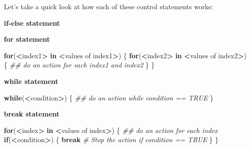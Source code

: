 \documentclass[
]{book}
\newenvironment{Shaded}{\begin{snugshade}}{\end{snugshade}}
\newcommand{\CommentTok}[1]{\textcolor[rgb]{0.56,0.35,0.01}{\textit{#1}}}
\newcommand{\ControlFlowTok}[1]{\textcolor[rgb]{0.13,0.29,0.53}{\textbf{#1}}}
\newcommand{\NormalTok}[1]{#1}
\newcommand{\OperatorTok}[1]{\textcolor[rgb]{0.81,0.36,0.00}{\textbf{#1}}}
\newcommand{\StringTok}[1]{\textcolor[rgb]{0.31,0.60,0.02}{#1}}
\begin{document}
Let's take a quick look at how each of these control statements works:

\textbf{if-else statement}

\begin{Shaded}
\end{Shaded}

\textbf{for statement}

\begin{Shaded}
\begin{Highlighting}[]
\ControlFlowTok{for}\NormalTok{(}\OperatorTok{<}\NormalTok{index1}\OperatorTok{>}\StringTok{ }\ControlFlowTok{in} \OperatorTok{<}\NormalTok{values of index1}\OperatorTok{>}\NormalTok{) \{}
  \ControlFlowTok{for}\NormalTok{(}\OperatorTok{<}\NormalTok{index2}\OperatorTok{>}\StringTok{ }\ControlFlowTok{in} \OperatorTok{<}\NormalTok{values of index2}\OperatorTok{>}\NormalTok{) \{}
    \CommentTok{## do an action for each index1 and index2}
\NormalTok{  \}}
\NormalTok{\}}
\end{Highlighting}
\end{Shaded}

\textbf{while statement}

\begin{Shaded}
\begin{Highlighting}[]
\ControlFlowTok{while}\NormalTok{(}\OperatorTok{<}\NormalTok{condition}\OperatorTok{>}\NormalTok{) \{}
  \CommentTok{## do an action while condition == TRUE}
\NormalTok{\}}
\end{Highlighting}
\end{Shaded}

\textbf{break statement}

\begin{Shaded}
\begin{Highlighting}[]
\ControlFlowTok{for}\NormalTok{(}\OperatorTok{<}\NormalTok{index}\OperatorTok{>}\StringTok{ }\ControlFlowTok{in} \OperatorTok{<}\NormalTok{values of index}\OperatorTok{>}\NormalTok{) \{}
  \CommentTok{## do an action for each index}
  \ControlFlowTok{if}\NormalTok{(}\OperatorTok{<}\NormalTok{condition}\OperatorTok{>}\NormalTok{) \{}
    \ControlFlowTok{break} \CommentTok{# Stop the action if condition == TRUE}
\NormalTok{  \}}
\NormalTok{\}}
\end{Highlighting}
\end{Shaded}
\end{document}
